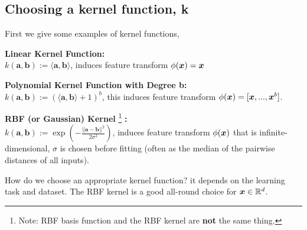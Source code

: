 \subsection{Choosing a kernel function, k}
First we give some examples of kernel functions,
\begin{definition}
    \textbf{Linear Kernel Function:} \\
    $k(\bm{a}, \bm{b}) := \langle \bm{a}, \bm{b} \rangle$, induces feature transform $\phi(\bm{x}) = \bm{x}$
\end{definition}
\begin{definition}
    \textbf{Polynomial Kernel Function with Degree b:} \\
    $k(\bm{a}, \bm{b}) := (\langle \bm{a} , \bm{b} \rangle +1)^{b}$, this induces feature transform $\phi(\bm{x}) = [\bm{x}, ..., \bm{x}^{b}]$.
\end{definition}
\begin{definition}
    \textbf{RBF (or Gaussian) Kernel} \footnote{Note: RBF basis function and the RBF kernel are \textbf{not} the same thing.} \textbf{:} \\
    $k(\bm{a}, \bm{b}) := \exp(- \frac{|| \bm{a} - \bm{b} ||^{2}}{2 \sigma^{2}})$, induces feature transform $\phi(\bm{x})$ that is infinite-dimensional, $\sigma$ is chosen before fitting (often as the median of the pairwise distances of all inputs).
\end{definition}
How do we choose an appropriate kernel function? it depends on the learning task and dataset. The RBF kernel is a good all-round choice for $\bm{x} \in \mathbb{R}^{d}$.